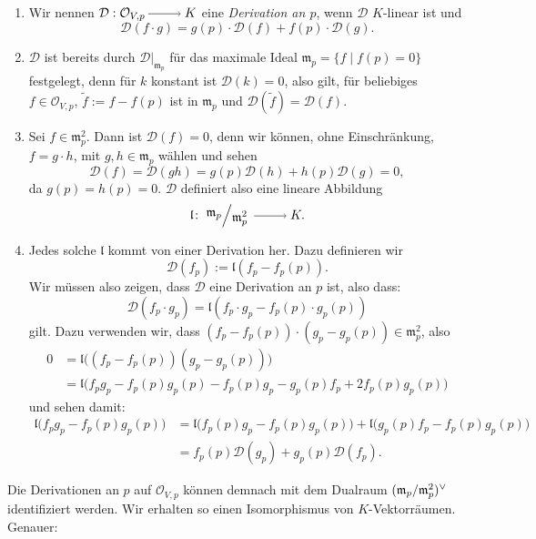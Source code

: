 \documentclass[a4paper,12pt,index=toc]{scrbook}
\theoremstyle{keinenummern} %
\def\O{\mathcal{O}}
\newcommand{\DD}{\mathcal{D}} %
\def\l{\mathfrak{l}}
\def\m{\mathfrak{m}}
\newcommand{\restrict}[1]{|_{#1}}
\newcommand{\schlange}[1]{\widetilde{#1}}
\begin{document}
\begin{db}\label{3.3.7}
\begin{enumerate}
\item{} Wir nennen $\DD:\O_{V,p}\ra K$ eine \emph{Derivation an $p$}, wenn $\DD$ $K$-linear ist und 
\[\DD(f\cdot g)=g(p)\cdot\DD(f)+f(p)\cdot\DD(g).\]
\item{} $\DD$ ist bereits durch $\DD\restrict{\m_{p}}$ für das maximale Ideal $\m_{p}=\{f\mid f(p)=0\}$ festgelegt, denn für $k$ konstant ist $\DD(k)=0$, also gilt, für beliebiges $f\in\O_{V,p}$, $\schlange{f}:=f-f(p)$ ist in $\m_{p}$ und $\DD(\schlange{f})=\DD(f)$.
\item{} Sei $f\in\m_{p}^{2}$. Dann ist $\DD(f)=0$, denn wir können, ohne Einschränkung, $f=g\cdot h$, mit $g,h\in\m_{p}$ wählen und sehen
\[\DD(f)=\DD(gh)=g(p)\DD(h)+h(p)\DD(g)=0,\]
da $g(p)=h(p)=0$. $\DD$ definiert also eine lineare Abbildung
\[\l\colon\Quotient{\m_{p}}{\m_{p}^{2}}\ra K.\]
\item{} Jedes solche $\l$ kommt von einer Derivation her. Dazu definieren wir \[\DD(f_{p}):=\l(f_{p}-f_{p}(p)).\]
%
Wir müssen also zeigen, dass $\DD$ eine Derivation an $p$ ist, also dass:
\[\DD(f_{p}\cdot g_{p})=\l(f_{p}\cdot g_{p}-f_{p}(p)\cdot g_{p}(p))\]
gilt. Dazu verwenden wir, dass $(f_{p}-f_{p}(p))\cdot(g_{p}-g_{p}(p))\in\m_{p}^{2}$, also
\begin{align*}
0&=\l\bigl((f_{p}-f_{p}(p))(g_{p}-g_{p}(p))\bigr)\\
&=\l\bigr(f_{p}g_{p}-f_{p}(p)g_{p}(p)-f_{p}(p)g_{p}-g_{p}(p)f_{p}+2f_{p}(p)g_{p}(p)\bigl)
\end{align*}
 und sehen damit:
\begin{align*}
\l\bigl(f_{p}g_{p}-f_{p}(p)g_{p}(p)\bigr)&=\l\bigl(f_{p}(p)g_{p}-f_{p}(p)g_{p}(p)\bigr) + \l\bigl(g_{p}(p)f_{p}-f_{p}(p)g_{p}(p)\bigr)\\
&=f_{p}(p)\DD(g_{p})+g_{p}(p)\DD(f_{p}).
\end{align*}
\end{enumerate}\end{db}

Die Derivationen an $p$ auf $\O_{V,p}$ können demnach mit dem Dualraum $(\Quotient{\m_{p}}{\m_{p}^{2}})^{\vee}$ identifiziert werden. Wir erhalten so einen Isomorphismus von $K$-Vektorräumen. Genauer:
\end{document}

